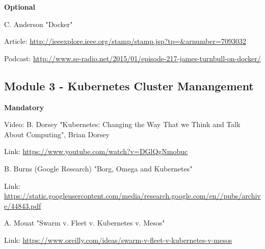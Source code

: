 \noindent\textbf{Optional}
\begin{compactitem}	
\setlength\itemsep{0.05em}
  \item C. Anderson "Docker"
  \begin{compactitem}
  	\item Article: \url{http://ieeexplore.ieee.org/stamp/stamp.jsp?tp=&arnumber=7093032}
  	\item Podcast: \url{http://www.se-radio.net/2015/01/episode-217-james-turnbull-on-docker/}
  \end{compactitem}
\end{compactitem}

\subsection*{Module 3 - Kubernetes Cluster Manangement}

\textbf{Mandatory}
\begin{compactitem}
\setlength\itemsep{0.05em}
  \item Video: B. Dorsey "Kubernetes: Changing the Way That we Think and Talk About Computing", Brian Dorsey
  \begin{compactitem}
  	\item Link: \url{https://www.youtube.com/watch?v=DGlQgNmobuc } 
  \end{compactitem}
  
    \item B. Burns (Google Research) "Borg, Omega and Kubernetes"
  \begin{compactitem}
  	\item Link: \url{https://static.googleusercontent.com/media/research.google.com/en//pubs/archive/44843.pdf} 
  \end{compactitem}
  
      \item A. Mouat "Swarm v. Fleet v. Kubernetes v. Mesos"
  \begin{compactitem}
  	\item Link: \url{https://www.oreilly.com/ideas/swarm-v-fleet-v-kubernetes-v-mesos} 
  \end{compactitem}
\end{compactitem}

